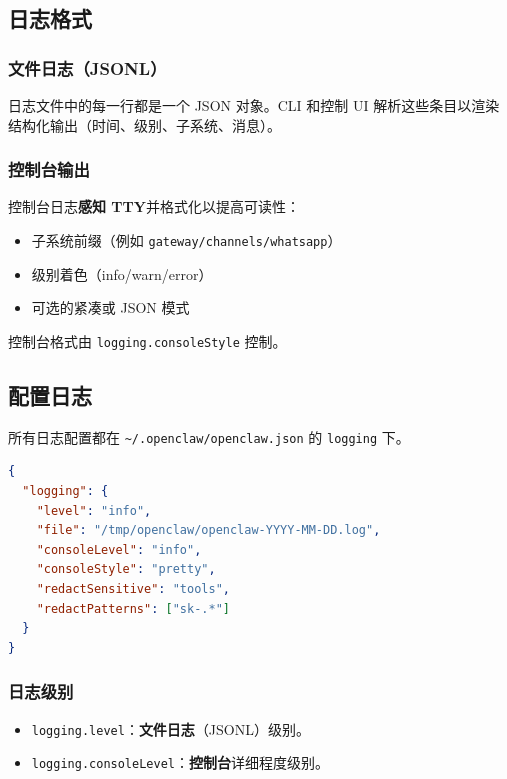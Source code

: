 \subsection{日志格式}


\subsubsection{文件日志（JSONL）}


日志文件中的每一行都是一个 JSON 对象。CLI 和控制 UI 解析这些条目以渲染结构化输出（时间、级别、子系统、消息）。

\subsubsection{控制台输出}


控制台日志\textbf{感知 TTY}并格式化以提高可读性：

\begin{itemize}
  \item 子系统前缀（例如 \texttt{gateway/channels/whatsapp}）
  \item 级别着色（info/warn/error）
  \item 可选的紧凑或 JSON 模式
\end{itemize}


控制台格式由 \texttt{logging.consoleStyle} 控制。

\subsection{配置日志}


所有日志配置都在 \texttt{\textasciitilde{}/.openclaw/openclaw.json} 的 \texttt{logging} 下。

\begin{lstlisting}[language=json]
{
  "logging": {
    "level": "info",
    "file": "/tmp/openclaw/openclaw-YYYY-MM-DD.log",
    "consoleLevel": "info",
    "consoleStyle": "pretty",
    "redactSensitive": "tools",
    "redactPatterns": ["sk-.*"]
  }
}
\end{lstlisting}


\subsubsection{日志级别}


\begin{itemize}
  \item \texttt{logging.level}：\textbf{文件日志}（JSONL）级别。
  \item \texttt{logging.consoleLevel}：\textbf{控制台}详细程度级别。
\end{itemize}


